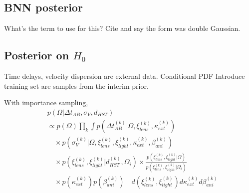 \subsection{BNN posterior}
What's the term to use for this? Cite \cite{wagnercarena2019double} and say the form was double Gaussian.

\subsection{Posterior on $H_0$}
Time delays, velocity dispersion are external data. Conditional PDF
Introduce training set are samples from the interim prior.

With importance sampling,
\begin{align}
    &p(\Omega | \Delta t_{AB}, \sigma_V, d_{HST}) \\
    &\propto p(\Omega) \prod_{k} \int p(\Delta t_{AB}^{(k)} | \Omega, \xi_{lens}^{(k)}, \kappa_{ext}^{(k)})  \nonumber \\
    & \quad \times p(\sigma_V^{(k)} | \Omega, \xi_{lens}^{(k)}, \xi_{light}^{(k)}, \kappa_{ext}^{(k)}, \beta_{ani}^{(k)})  \nonumber \\
    & \quad \times p(\xi_{lens}^{(k)}, \xi_{light}^{(k)} | d_{HST}^{(k)}, \Omega_i) \times \frac{p(\xi_{lens}^{(k)}, \xi_{light}^{(k)} | \Omega)}{ p(\xi_{lens}^{(k)}, \xi_{light}^{(k)} | \Omega_i)} \nonumber \\
    & \quad \times p(\kappa_{ext}^{(k)}) p(\beta_{ani}^{(k)}) 
    \quad d \left( \xi_{lens}^{(k)}, \xi_{light}^{(k)} \right) d \kappa_{ext}^{(k)} d \beta_{ani}^{(k)} \nonumber
\end{align}